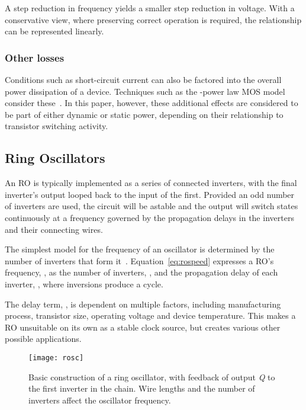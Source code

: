 \documentclass[a4paper,twocolumn,DIV=16]{scrartcl}
\begin{document}
A step reduction in frequency yields a smaller step reduction in voltage. With a
conservative view, where preserving correct operation is required, the
relationship can be represented linearly.

\subsubsection*{Other losses}

Conditions such as short-circuit current can also be factored into the overall
power dissipation of a device. Techniques such as the -power law MOS
model consider these~\cite{Sakurai1988}. In this paper, however, these
additional effects are considered to be part of either dynamic or static power,
depending on their relationship to transistor switching activity.

\subsection{Ring Oscillators}

An RO is typically implemented as a series of connected inverters, with the
final inverter's output looped back to the input of the first. Provided an
odd number of inverters are used, the circuit will be astable and the output
will switch states continuously at a frequency governed by the propagation
delays in the inverters and their connecting wires.

The simplest model for the frequency of an oscillator is determined by the
number of inverters that form it~\cite{Mandal2010}. Equation~\ref{eq:rospeed}
expresses a RO's frequency, , as the number of inverters,
, and the propagation delay of each inverter, , where 
inversions produce a cycle.



The delay term, , is dependent on multiple factors, including
manufacturing process, transistor size, operating voltage and device
temperature. This makes a RO unsuitable on its own as a stable clock source,
but creates various other possible applications.

\begin{figure}[]
\centering
\texttt{[image: rosc]}
\caption{Basic construction of a ring oscillator, with feedback of output
\emph{Q} to the first inverter in the chain. Wire lengths and the number of
inverters affect the oscillator frequency.}
\label{fig:RO}
\end{figure}
\end{document}
